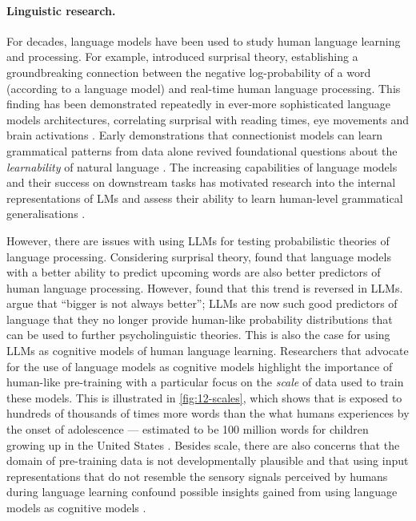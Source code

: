 \paragraph{Linguistic research.} For decades, language models have been used to study human language learning and processing. For example, \citet{hale-2001-probabilistic} introduced surprisal theory, establishing a groundbreaking connection between the negative log-probability of a word (according to a language model) and real-time human language processing. This finding has been demonstrated repeatedly in ever-more sophisticated language models architectures, correlating surprisal with reading times, eye movements and brain activations \citep[e.g.][]{levy2008expectation, futrell2019neural, futrell2020lossy, schrimpf2021neural}. Early demonstrations that connectionist models can learn grammatical patterns from data alone \citep[e.g.,][]{elman-1990-finding, macdonald1994lexical} revived foundational questions about the \emph{learnability} of natural language \citep{gold1967language}. The increasing capabilities of language models and their success on downstream tasks has motivated research into the internal representations of LMs and assess their ability to learn human-level grammatical generalisations \citep{hewitt-manning-2019-structural, hu-etal-2020-systematic, manning-2020-emergent}.


However, there are issues with using LLMs for testing probabilistic theories of language processing. Considering surprisal theory, \citet{wilcox2020predictive} found that language models with a better ability to predict upcoming words are also better predictors of human language processing. However, \citet{shain2024large, oh2024frequency} found that this trend is reversed in LLMs. \citet{wilcox2025} argue that ``bigger is not always better''; LLMs are now such good predictors of language that they no longer provide human-like probability distributions that can be used to further psycholinguistic theories. This is also the case for using LLMs as cognitive models of human language learning. Researchers that advocate for the use of language models as cognitive models highlight the importance of human-like pre-training \citep{linzen-2020-accelerate, baroni-2022-proper,warstadt-2022-artificial,wilcox2025} with a particular focus on the \emph{scale} of data used to train these models. This is illustrated in \cref{fig:12-scales}, which shows that  is exposed to hundreds of thousands of times more words than the what humans experiences by the onset of adolescence --- estimated to be 100 million words for children growing up in the United States \citep{gilkerson2017mapping}. Besides scale, there are also concerns that the domain of pre-training data is not developmentally plausible \citep{huebner-etal-2021-babyberta, warstadt2023findings} and that using input representations that do not resemble the sensory signals perceived by humans during language learning confound possible insights gained from using language models as cognitive models \citet{dupoux-2018-cognitive}. 


